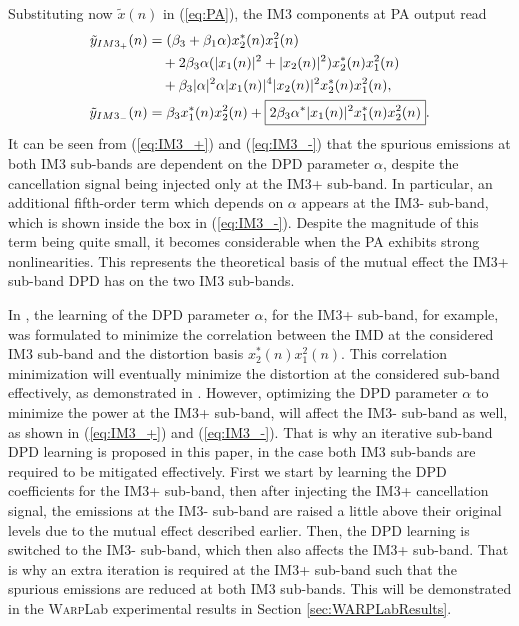 Substituting now $\tilde{x}(n)$ in (\ref{eq:PA}), the IM3 components at PA output read
\begin{align}
\small
\tilde{y}_{IM3_+}(n) &= (\beta_3 + \beta_1 \alpha) x_2^*(n) x_1^2(n) \nonumber\\
& \quad + 2 \beta_3 \alpha (|x_1(n)|^2 + |x_2(n)|^2) x_2^*(n) x_1^2(n) \nonumber\\ 
& \quad + \beta_3 |\alpha|^2 \alpha |x_1(n)|^4 |x_2(n)|^2 x_2^*(n) x_1^2(n), \label{eq:IM3_+}\\
\tilde{y}_{IM3_-}(n) &=  \beta_3 x_1^*(n) x_2^2(n) + \boxed{2 \beta_3 \alpha^* |x_1(n)|^2 x_1^*(n) x_2^2(n)}. \label{eq:IM3_-}
\end{align}
\normalsize
It can be seen from (\ref{eq:IM3_+}) and (\ref{eq:IM3_-}) that the spurious emissions at both IM3 sub-bands are dependent on the DPD parameter $\alpha$, despite the cancellation signal being injected only at the IM3+ sub-band. In particular, an additional fifth-order term which depends on $\alpha$ appears at the IM3- sub-band, which is shown inside the box in (\ref{eq:IM3_-}). Despite the magnitude of this term being quite small, it becomes considerable when the PA exhibits strong nonlinearities. This represents the theoretical basis of the mutual effect the IM3+ sub-band DPD has on the two IM3 sub-bands.

In \cite{ICASSP2014}, the learning of the DPD parameter $\alpha$, for the IM3+ sub-band, for example, was formulated to minimize the correlation between the IMD at the considered IM3 sub-band and the distortion basis $x_2^*(n)x_1^2(n)$. This correlation minimization will eventually minimize the distortion at the considered sub-band effectively, as demonstrated in \cite{ICASSP2014,Asilomar2015}. However, optimizing the DPD parameter $\alpha$ to minimize the power at the IM3+ sub-band, will affect the IM3- sub-band as well, as shown in (\ref{eq:IM3_+}) and (\ref{eq:IM3_-}). That is why an iterative sub-band DPD learning is proposed in this paper, in the case both IM3 sub-bands are required to be mitigated effectively. First we start by learning the DPD coefficients for the IM3+ sub-band, then after injecting the IM3+ cancellation signal, the emissions at the IM3- sub-band are raised a little above their original levels due to the mutual effect described earlier. Then, the DPD learning is switched to the IM3- sub-band, which then also affects the IM3+ sub-band. That is why an extra iteration is required at the IM3+ sub-band such that the spurious emissions are reduced at both IM3 sub-bands. This will be demonstrated in the \textsc{Warp}Lab experimental results in Section \ref{sec:WARPLabResults}.

